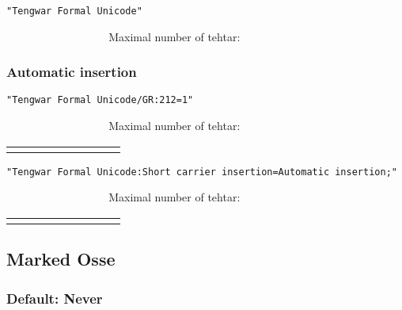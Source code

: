 \documentclass[11pt,a4paper]{article}
\begin{document}
\noindent \texttt{"Tengwar Formal Unicode"}

\formalAAT      \normalfont Maximal number of tehtar:
\formalAAT 


\subsubsection{Automatic insertion}

\texttt{"Tengwar Formal Unicode/GR:212=1"}

\formalGRinsert      \normalfont Maximal number of tehtar:
\formalGRinsert 

\begin{tabular}{ c | c c c c c c c c}
	\combinationsrow{‍} \hline
	\combinationsrow{‍}
	\combinationsrow{‍}
	\combinationsrow{‍}
	\combinationsrow{‍}
	\combinationsrow{‍}
	\combinationsrow{‍}
	\combinationsrow{‍}
	\combinationsrow{‍}
\end{tabular}

\noindent \texttt{"Tengwar Formal Unicode:Short carrier insertion=Automatic insertion;"}

\formalAATinsert      \normalfont Maximal number of tehtar:
\formalAATinsert 

\begin{tabular}{ c | c c c c c c c c}
	\combinationsrow{‍} \hline
	\combinationsrow{‍}
	\combinationsrow{‍}
	\combinationsrow{‍}
	\combinationsrow{‍}
	\combinationsrow{‍}
	\combinationsrow{‍}
	\combinationsrow{‍}
	\combinationsrow{‍}
\end{tabular}


\subsection{Marked Osse}

\subsubsection{Default: Never}
\end{document}

